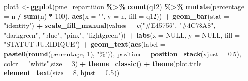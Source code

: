 \documentclass[
]{article}
\newenvironment{Shaded}{\begin{snugshade}}{\end{snugshade}}
\newcommand{\AttributeTok}[1]{\textcolor[rgb]{0.13,0.29,0.53}{#1}}
\newcommand{\ConstantTok}[1]{\textcolor[rgb]{0.56,0.35,0.01}{#1}}
\newcommand{\DecValTok}[1]{\textcolor[rgb]{0.00,0.00,0.81}{#1}}
\newcommand{\FloatTok}[1]{\textcolor[rgb]{0.00,0.00,0.81}{#1}}
\newcommand{\FunctionTok}[1]{\textcolor[rgb]{0.13,0.29,0.53}{\textbf{#1}}}
\newcommand{\NormalTok}[1]{#1}
\newcommand{\OtherTok}[1]{\textcolor[rgb]{0.56,0.35,0.01}{#1}}
\newcommand{\SpecialCharTok}[1]{\textcolor[rgb]{0.81,0.36,0.00}{\textbf{#1}}}
\newcommand{\StringTok}[1]{\textcolor[rgb]{0.31,0.60,0.02}{#1}}
\begin{document}
\begin{Shaded}
\begin{Highlighting}[]
\NormalTok{plot3 }\OtherTok{\textless{}{-}} \FunctionTok{ggplot}\NormalTok{(pme\_repartition }\SpecialCharTok{\%\textgreater{}\%}
                 \FunctionTok{count}\NormalTok{(q12) }\SpecialCharTok{\%\textgreater{}\%}
                 \FunctionTok{mutate}\NormalTok{(}\AttributeTok{percentage =}\NormalTok{ n }\SpecialCharTok{/} \FunctionTok{sum}\NormalTok{(n) }\SpecialCharTok{*} \DecValTok{100}\NormalTok{),}
                \FunctionTok{aes}\NormalTok{(}\AttributeTok{x =} \StringTok{""}\NormalTok{, }\AttributeTok{y =}\NormalTok{ n, }\AttributeTok{fill =}\NormalTok{ q12)) }\SpecialCharTok{+}
  \FunctionTok{geom\_bar}\NormalTok{(}\AttributeTok{stat =} \StringTok{"identity"}\NormalTok{) }\SpecialCharTok{+}
  \FunctionTok{scale\_fill\_manual}\NormalTok{(}\AttributeTok{values =} \FunctionTok{c}\NormalTok{(}\StringTok{"\#E45756"}\NormalTok{, }\StringTok{"\#4C78A8"}\NormalTok{, }
                               \StringTok{"darkgreen"}\NormalTok{, }\StringTok{"blue"}\NormalTok{, }\StringTok{"pink"}\NormalTok{, }\StringTok{"lightgreen"}\NormalTok{)) }\SpecialCharTok{+}
  \FunctionTok{labs}\NormalTok{(}\AttributeTok{x =} \ConstantTok{NULL}\NormalTok{, }\AttributeTok{y =} \ConstantTok{NULL}\NormalTok{, }\AttributeTok{fill =} \StringTok{"STATUT JURIDIQUE"}\NormalTok{) }\SpecialCharTok{+}
  \FunctionTok{geom\_text}\NormalTok{(}\FunctionTok{aes}\NormalTok{(}\AttributeTok{label =} \FunctionTok{paste0}\NormalTok{(}\FunctionTok{round}\NormalTok{(percentage, }\DecValTok{1}\NormalTok{), }\StringTok{"\%"}\NormalTok{)), }
            \AttributeTok{position =} \FunctionTok{position\_stack}\NormalTok{(}\AttributeTok{vjust =} \FloatTok{0.5}\NormalTok{), }\AttributeTok{color =} \StringTok{"white"}\NormalTok{,}\AttributeTok{size =} \DecValTok{3}\NormalTok{) }\SpecialCharTok{+}
  \FunctionTok{theme\_classic}\NormalTok{() }\SpecialCharTok{+}
  \FunctionTok{theme}\NormalTok{(}\AttributeTok{plot.title =} \FunctionTok{element\_text}\NormalTok{(}\AttributeTok{size =} \DecValTok{8}\NormalTok{, }\AttributeTok{hjust =} \FloatTok{0.5}\NormalTok{))}


\end{Highlighting}
\end{Shaded}
\end{document}
